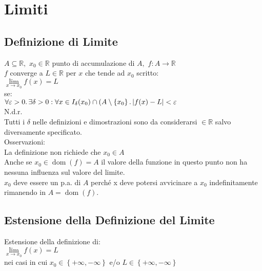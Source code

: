 \documentclass[a4paper, twoside, italian, 11pt]{book}
\newcommand{\braces}[1] {\left \{ #1 \right \}}
\newcommand{\abs}[1] {\left | #1 \right |}
\DeclareMathOperator{\dom}{dom}
\newcommand{\R}{\mathbb{R}}
\begin{document}
\chapter{Limiti}



\section{Definizione di Limite}

\noindent
$A \subseteq \R,$ $x_0 \in \R$ punto di accumulazione di $A,$ $f: A \rightarrow \R$ \\

$f$ converge a $L \in \R$ per $x$ che tende ad $x_0$ scritto: \\

$\lim\limits_{x \to x_0} f(x) = L$ \\

\noindent
se: \\

$\forall \varepsilon > 0 \ldotp \exists \delta > 0 : \forall x \in I_\delta(x_0) \cap (A \setminus \braces{x_0} \ldotp \abs{f(x) - L} < \varepsilon$ \\

\noindent
N.d.r. \\
Tutti i $\delta$ nelle definizioni e dimostrazioni sono da considerarsi $\in \R$ salvo diversamente specificato. \\

\noindent
Osservazioni: \\
La definizione non richiede che $x_0 \in A$ \\
Anche se $x_0 \in \dom(f) = A$ il valore della funzione in questo punto non ha nessuna influenza sul valore del limite. \\
$x_0$ deve essere un p.a. di $A$ perché x deve potersi avvicinare a $x_0$ indefinitamente rimanendo in $A = \dom(f)$.



\section{Estensione della Definizione del Limite}

\noindent
Estensione della definizione di: \\

$\lim\limits_{x \to x_0} f(x) = L$ \\

\noindent
nei casi in cui $x_0 \in \braces{+\infty, -\infty}$ e/o $L \in \braces{+\infty, -\infty}$ \\
\end{document}
